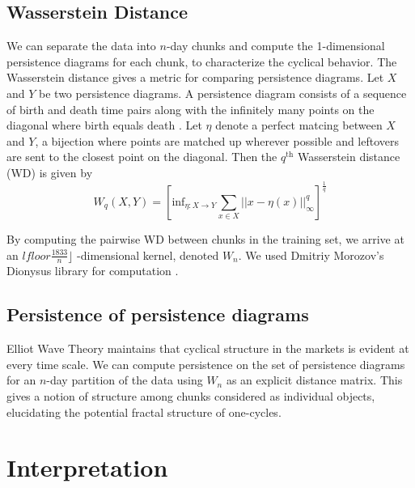 \documentclass{article}
\begin{document}
\subsection{Wasserstein Distance}

We can separate the data into $n$-day chunks and compute the 1-dimensional persistence diagrams for each chunk, to characterize the cyclical behavior. The Wasserstein distance gives a metric for comparing persistence diagrams. Let $X$ and $Y$ be two persistence diagrams. A persistence diagram consists of a sequence of birth and death time pairs along with the infinitely many points on the diagonal where birth equals death . Let $\eta$ denote a perfect matcing between $X$ and $Y$, a bijection where points are matched up wherever possible and leftovers are sent to the closest point on the diagonal. Then the $q^{\text{th}}$ Wasserstein distance (WD)  is given by 
\[
W_q(X,Y) = \left[ \text{inf}_{\eta:X \rightarrow Y} \sum_{x \in X} || x  - \eta(x) ||^q_\infty \right]^{\frac{1}{q}}
\]

By computing the pairwise WD between chunks in the training set, we arrive at an $lfloor \frac{1833}{n} \rfloor$ -dimensional kernel, denoted $W_n$. We used Dmitriy Morozov’s Dionysus library for computation \cite{morozov2012}.

\subsection{Persistence of persistence diagrams}
Elliot Wave Theory maintains that cyclical structure in the markets is evident at every time scale. We can compute persistence on the set of persistence diagrams for an $n$-day partition of the data using $W_n$ as an explicit distance matrix. This gives a notion of structure among chunks considered as individual objects, elucidating the potential fractal structure of one-cycles.


\section{Interpretation}
\end{document}
